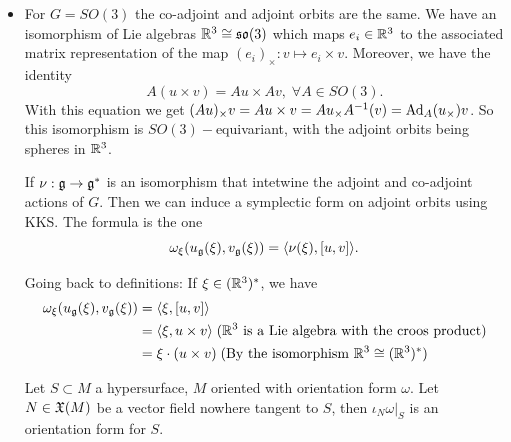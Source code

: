 \begin{itemize}
\begin{equation}
\begin{split}
            \iota_{u_{\fr{g}^*}}\omega\big|_\xi(v_{\fr{g}^*}(\xi))&=\langle\xi,[u,v] \rangle\\
            &=\langle\xi,[u,v] \rangle\\
            &=v_{\fr{g}^*}(\xi)(u)\\
            &=du\big|_\xi v_{\fr{g}^*}(\xi)\;(\text{by the identification }\fr{g}^{**}=\fr{g})
        \end{split}
    \end{equation}
    \item For $G=SO(3)$ the co-adjoint and adjoint orbits are the same. We have an isomorphism of Lie algebras
    $\mathbb{R}^3\cong\mathfrak{so}(3)$ which maps $e_i\in\mathbb{R}^3$ to the associated matrix representation of the map 
    $(e_i)_\times:v\mapsto e_i\times v$. Moreover, we have the identity 
    \begin{equation}
        A(u\times v)= Au\times Av,\; \forall A\in SO(3).
    \end{equation}
    With this equation we get $(Au)_\times v = Au\times v = Au_\times A^{-1}(v)=\text{Ad}_A(u_\times)v$. So this isomorphism 
    is $SO(3)-$equivariant, with the adjoint orbits being spheres in $\mathbb{R}^3$.
    \begin{dang}
     \begin{remark}
        If $\nu: \mathfrak{g}\to \mathfrak{g}^*$ is an isomorphism that intetwine the adjoint and co-adjoint actions of $G$. Then we 
        can induce a symplectic form on adjoint orbits using KKS. The formula is the one 
        \begin{equation}
            \omega_\xi(u_{\mathfrak{g}}(\xi),v_{\mathfrak{g}}(\xi))=\langle \nu(\xi), [u,v]\rangle.
        \end{equation}
    \end{remark}    
    \end{dang}

    Going back to definitions: If $\xi\in(\mathbb{R}^3)^*$, we have 
    \begin{equation}
        \begin{split}
            \omega_\xi(u_{\mathfrak{g}}(\xi),v_{\mathfrak{g}}(\xi))&=\langle\xi,[u,v]\rangle\\
        &=\langle \xi, u\times v\rangle \;(\mathbb{R}^3\text{ is a Lie algebra with the croos product})\\
        &=\xi\cdot (u\times v)\;(\text{By the isomorphism }\mathbb{R}^3\cong(\mathbb{R}^3)^*)
        \end{split}
    \end{equation}
    \begin{dang}
    \begin{remark}
        Let $S\subset M$ a hypersurface, $M$ oriented with orientation form $\omega$. Let 
        $N\in\mathfrak{X}(M)$ be a vector field nowhere tangent to $S$, then $\iota_N\omega|_S$ is an orientation 
        form for $S$.
    \end{remark}        
    \end{dang}


\end{itemize}
